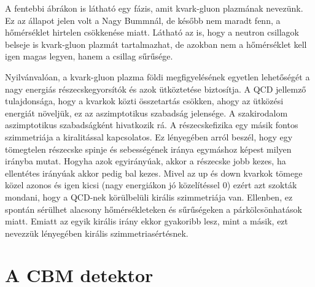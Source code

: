 \documentclass[a4paper,12pt]{article}
\begin{document}
\par A fentebbi ábrákon is látható egy fázis, amit kvark-gluon plazmának nevezünk. Ez az állapot jelen volt a Nagy Bummnál, de később
nem maradt fenn, a hőmérséklet hirtelen csökkenése miatt. Látható az is, hogy a neutron csillagok belseje is kvark-gluon plazmát tartalmazhat,
de azokban nem a hőmérséklet kell igen magas legyen, hanem a csillag sűrűsége. 
\vspace{5mm}
\par Nyilvánvalóan, a kvark-gluon plazma földi megfigyelésének egyetlen lehetőségét a nagy energiás részecskegyorsítók és azok
ütköztetése biztosítja. A QCD jellemző tulajdonsága, hogy a kvarkok közti összetartás csökken, ahogy az ütközési energiát
növeljük, ez az aszimptotikus szabadság jelensége. A szakirodalom aszimptotikus szabadságként hivatkozik rá. A részecskefizika egy másik fontos
szimmetriája a kiralitással kapcsolatos. Ez lényegében arról beszél, hogy egy tömegtelen részecske spinje és sebességének iránya egymáshoz 
képest milyen irányba mutat. Hogyha azok egyirányúak, akkor a részecske jobb kezes, ha ellentétes irányúak akkor pedig bal kezes. Mivel
az up és down kvarkok tömege közel azonos és igen kicsi (nagy energiákon jó közelítéssel 0)
ezért azt szokták mondani, hogy a QCD-nek körülbelüli királis szimmetriája van. Ellenben, ez spontán
sérülhet alacsony hőmérsékleteken és sűrűségeken a párkölcsönhatások miatt. Emiatt az egyik királis irány ekkor 
gyakoribb lesz, mint a másik, ezt nevezzük lényegében királis szimmetriasértésnek. 
\section{ A CBM detektor}
\end{document}
